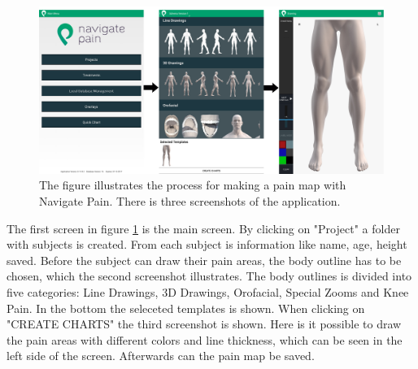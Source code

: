 \begin{figure} [H]
\centering
\includegraphics[width=1\textwidth]{figures/Navigatepain}
\caption{The figure illustrates the process for making a pain map with Navigate Pain. There is three screenshots of the application.}
\label{fig:Navigatepain}
\end{figure}

\noindent
The first screen in figure \ref{fig:Navigatepain} is the main screen. By clicking on "Project" a folder with subjects is created. From each subject is information like name, age, height saved. Before the subject can draw their pain areas, the body outline has to be chosen, which the second screenshot illustrates. The body outlines is divided into five categories: Line Drawings, 3D Drawings, Orofacial, Special Zooms and Knee Pain. In the bottom the seleceted templates is shown. When clicking on "CREATE CHARTS" the third screenshot is shown. Here is it possible to draw the pain areas with different colors and line thickness, which can be seen in the left side of the screen. Afterwards can the pain map be saved. 


